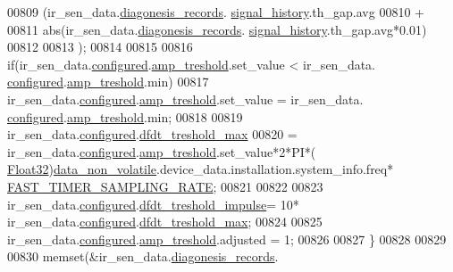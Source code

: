 \begin{DoxyCode}
00809                          (ir\_sen\_data.\hyperlink{a00023_a7ae905b560513ad201e58c2f63375030}{diagonesis\_records}.
      \hyperlink{a00017_affb63906d23cb1cb7787d61eaaedfb60}{signal\_history}.th\_gap.avg
00810                           +
00811                          abs(ir\_sen\_data.\hyperlink{a00023_a7ae905b560513ad201e58c2f63375030}{diagonesis\_records}.
      \hyperlink{a00017_affb63906d23cb1cb7787d61eaaedfb60}{signal\_history}.th\_gap.avg*0.01)
00812 
00813                          );
00814 
00815 
00816                      \textcolor{keywordflow}{if}(ir\_sen\_data.\hyperlink{a00023_a94b2d1f6ea4ab334c74d24984dd27843}{configured}.\hyperlink{a00021_a4b3bbfb0267daea1432f2603825ade62}{amp\_treshold}.set\_value < ir\_sen\_data.
      \hyperlink{a00023_a94b2d1f6ea4ab334c74d24984dd27843}{configured}.\hyperlink{a00021_a4b3bbfb0267daea1432f2603825ade62}{amp\_treshold}.min)
00817                         ir\_sen\_data.\hyperlink{a00023_a94b2d1f6ea4ab334c74d24984dd27843}{configured}.\hyperlink{a00021_a4b3bbfb0267daea1432f2603825ade62}{amp\_treshold}.set\_value = ir\_sen\_data.
      \hyperlink{a00023_a94b2d1f6ea4ab334c74d24984dd27843}{configured}.\hyperlink{a00021_a4b3bbfb0267daea1432f2603825ade62}{amp\_treshold}.min;
00818 
00819                       ir\_sen\_data.\hyperlink{a00023_a94b2d1f6ea4ab334c74d24984dd27843}{configured}.\hyperlink{a00021_adf9a37828e447378b1d533185213316d}{dfdt\_treshold\_max}
00820                         = ir\_sen\_data.\hyperlink{a00023_a94b2d1f6ea4ab334c74d24984dd27843}{configured}.\hyperlink{a00021_a4b3bbfb0267daea1432f2603825ade62}{amp\_treshold}.set\_value*2*PI*(
      \hyperlink{a00072_a87d38f886e617ced2698fc55afa07637}{Float32})\hyperlink{a00060_a76ac5f917f5308dcd83de0d7c94559fb}{data\_non\_volatile}.device\_data.installation.system\_info.freq*
      \hyperlink{a00021_a3a4dcb8af26a561d90607a41a3745806}{FAST\_TIMER\_SAMPLING\_RATE};
00821 
00822 
00823                      ir\_sen\_data.\hyperlink{a00023_a94b2d1f6ea4ab334c74d24984dd27843}{configured}.\hyperlink{a00021_a3b9c683370c94430a4c6a9d78ce6f5ef}{dfdt\_treshold\_impulse}= 10*
      ir\_sen\_data.\hyperlink{a00023_a94b2d1f6ea4ab334c74d24984dd27843}{configured}.\hyperlink{a00021_adf9a37828e447378b1d533185213316d}{dfdt\_treshold\_max};
00824 
00825                      ir\_sen\_data.\hyperlink{a00023_a94b2d1f6ea4ab334c74d24984dd27843}{configured}.\hyperlink{a00021_a4b3bbfb0267daea1432f2603825ade62}{amp\_treshold}.adjusted = 1;
00826 
00827                   \}
00828 
00829 
00830                    memset(&ir\_sen\_data.\hyperlink{a00023_a7ae905b560513ad201e58c2f63375030}{diagonesis\_records}.

\end{DoxyCode}
